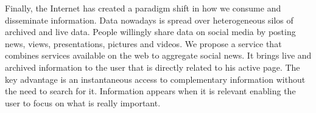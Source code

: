 Finally, the Internet has created a paradigm shift in how we consume and disseminate information. Data nowadays is spread over heterogeneous silos of archived and live data. People willingly share data on social media by posting news, views, presentations, pictures and videos. We propose a service that combines services available on the web to aggregate social news. It brings live and archived information to the user that is directly related to his active page. The key advantage is an instantaneous access to complementary information without the need to search for it. Information appears when it is relevant enabling the user to focus on what is really important.
